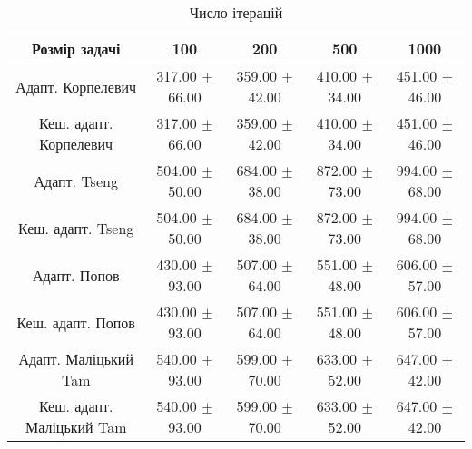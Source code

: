 \begin{table}[H]
	\centering
	\begin{tabular}{|c||c|c|c|c|}\hline
		Розмір задачі & 100 & 200 & 500 & 1000 \\ \hline \hline
		Адапт. Корпелевич & 317.00 $\pm$ 66.00 & 359.00 $\pm$ 42.00 & 410.00 $\pm$ 34.00 & 451.00 $\pm$ 46.00 \\ \hline
		Кеш. адапт. Корпелевич & 317.00 $\pm$ 66.00 & 359.00 $\pm$ 42.00 & 410.00 $\pm$ 34.00 & 451.00 $\pm$ 46.00 \\ \hline
		Адапт. Tseng & 504.00 $\pm$ 50.00 & 684.00 $\pm$ 38.00 & 872.00 $\pm$ 73.00 & 994.00 $\pm$ 68.00 \\ \hline
		Кеш. адапт. Tseng & 504.00 $\pm$ 50.00 & 684.00 $\pm$ 38.00 & 872.00 $\pm$ 73.00 & 994.00 $\pm$ 68.00 \\ \hline
		Адапт. Попов & 430.00 $\pm$ 93.00 & 507.00 $\pm$ 64.00 & 551.00 $\pm$ 48.00 & 606.00 $\pm$ 57.00 \\ \hline
		Кеш. адапт. Попов & 430.00 $\pm$ 93.00 & 507.00 $\pm$ 64.00 & 551.00 $\pm$ 48.00 & 606.00 $\pm$ 57.00 \\ \hline
		Адапт. Маліцький Tam & 540.00 $\pm$ 93.00 & 599.00 $\pm$ 70.00 & 633.00 $\pm$ 52.00 & 647.00 $\pm$ 42.00 \\ \hline
		Кеш. адапт. Маліцький Tam & 540.00 $\pm$ 93.00 & 599.00 $\pm$ 70.00 & 633.00 $\pm$ 52.00 & 647.00 $\pm$ 42.00 \\ \hline
	\end{tabular}
	\caption{Число ітерацій}
\end{table}
